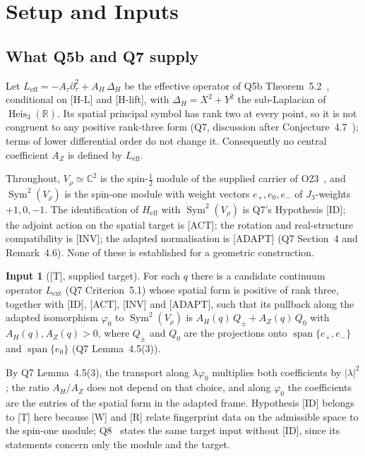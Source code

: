 \documentclass[12pt,a4paper]{article}
\theoremstyle{definition}
\newtheorem*{hypo}{Input}
\theoremstyle{remark}
\DeclareMathOperator{\Heis}{Heis}
\DeclareMathOperator{\Sym}{Sym}
\DeclareMathOperator{\spn}{span}
\newcommand{\Heff}{H_{\mathrm{eff}}}
\begin{document}
  \section{Setup and Inputs}\label{sec:setup}

    \subsection{What Q5b and Q7 supply}

      Let $L_{\mathrm{eff}} = -A_\tau\partial_\tau^2 + A_H\,\Delta_H$ be the effective operator of Q5b
      Theorem~5.2~\cite{Beau2026q5b}, conditional on [H-L] and [H-lift], with $\Delta_H = X^2 + Y^2$ the
      sub-Laplacian of $\Heis_3(\mathbb{R})$.
      Its spatial principal symbol has rank two at every point, so it is not congruent to any positive rank-three
      form (Q7, discussion after Conjecture~4.7~\cite{Beau2026q7}); terms of lower differential order do not change
      it.
      Consequently no central coefficient $A_Z$ is defined by $L_{\mathrm{eff}}$.

      Throughout, $V_\rho \simeq \mathbb{C}^2$ is the spin-$\frac12$ module of the supplied carrier of
      O23~\cite{Beau2026a27}, and $\Sym^2(V_\rho)$ is the spin-one module with weight vectors
      $e_+, e_0, e_-$ of $J_3$-weights $+1, 0, -1$.
      The identification of $\Heff$ with $\Sym^2(V_\rho)$ is Q7's Hypothesis [ID]; the adjoint action on the spatial
      target is [ACT]; the rotation and real-structure compatibility is [INV]; the adapted normalisation is [ADAPT]
      (Q7 Section~4 and Remark~4.6).
      None of these is established for a geometric construction.

      \begin{hypo}[{[T]}, supplied target]
        For each $q$ there is a candidate continuum operator $L_{\mathrm{ext}}$ (Q7 Criterion~5.1) whose spatial
        form is positive of rank three, together with [ID], [ACT], [INV] and [ADAPT], such that its pullback along the
        adapted isomorphism $\varphi_0$ to $\Sym^2(V_\rho)$ is $A_H(q)\,Q_\pm + A_Z(q)\,Q_0$ with $A_H(q),
        A_Z(q) > 0$, where $Q_\pm$ and $Q_0$ are
        the projections onto $\spn\{e_+, e_-\}$ and $\spn\{e_0\}$ (Q7 Lemma~4.5(3)).
      \end{hypo}

      By Q7 Lemma~4.5(3), the transport along $\lambda\varphi_0$ multiplies both coefficients by $|\lambda|^2$; the
      ratio $A_H/A_Z$ does not depend on that choice, and along $\varphi_0$ the coefficients are the entries of the
      spatial form in the adapted frame.
      Hypothesis [ID] belongs to [T] here because [W] and [R] relate fingerprint data on the admissible space to the
      spin-one module; Q8~\cite{BeauQ8} states the same target input without [ID], since its statements concern only
      the module and the target.
\end{document}
